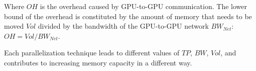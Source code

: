 Where $OH$ is the overhead caused by GPU-to-GPU communication. The lower bound of the overhead is constituted by the amount of memory that needs to be moved $Vol$ divided by the bandwidth of the GPU-to-GPU network $BW_{Net}$:  $OH = Vol/BW_{Net}$. 

Each parallelization technique leads to different values of $TP$, $BW$, $Vol$, and contributes to increasing memory capacity in a different way.

